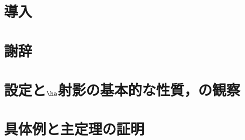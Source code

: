 \documentclass[12pt,dvipdfmx,uplatex]{jsarticle}
\begin{document}


\newgeometry{}

\makeatletter

\renewcommand*{\l@section}[2]{%
  \ifnum \c@tocdepth >\z@
    \addpenalty{\@secpenalty}%
    \addvspace{1.0em \@plus\p@}%
    \begingroup
      \parindent\z@
      \rightskip\@tocrmarg
      \parfillskip-\rightskip
      \leavevmode\headfont
      \setlength\@lnumwidth{1.5em}%
      \advance\leftskip\@lnumwidth \hskip-\leftskip
      #1\nobreak
      \leaders\hbox{\normalfont$\m@th \mkern \@dotsep mu\hbox{.}\mkern \@dotsep mu$}\hfill %
      \nobreak\hbox to\@pnumwidth{\hss#2}\par
    \endgroup
  \fi}

\makeatother


\setcounter{tocdepth}{3}
\tableofcontents


\clearpage

\section*{導入}


\section*{謝辞}

% 

\clearpage

\section{設定と$\ha$射影の基本的な性質，の観察}



\section{具体例と主定理の証明}




\begin{thebibliography}{99}
  
\end{thebibliography}
\end{document}
